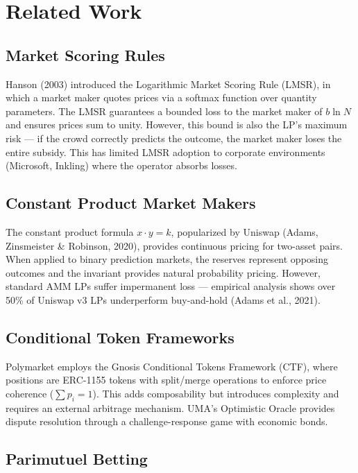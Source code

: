 \documentclass{ledger}
\theoremstyle{plain}
\theoremstyle{remark}
\begin{document}
\section{Related Work}\label{sec:related}

\subsection{Market Scoring Rules}

Hanson (2003) introduced the Logarithmic Market Scoring Rule (LMSR), in which a
market maker quotes prices via a softmax function over quantity parameters. The
LMSR guarantees a bounded loss to the market maker of $b \ln N$ and ensures
prices sum to unity. However, this bound is also the LP's maximum risk --- if
the crowd correctly predicts the outcome, the market maker loses the entire
subsidy. This has limited LMSR adoption to corporate environments (Microsoft,
Inkling) where the operator absorbs losses.

\subsection{Constant Product Market Makers}

The constant product formula $x \cdot y = k$, popularized by Uniswap (Adams,
Zinsmeister \& Robinson, 2020), provides continuous pricing for two-asset pairs.
When applied to binary prediction markets, the reserves represent opposing
outcomes and the invariant provides natural probability pricing. However,
standard AMM LPs suffer impermanent loss --- empirical analysis shows over 50\%
of Uniswap v3 LPs underperform buy-and-hold (Adams et al., 2021).

\subsection{Conditional Token Frameworks}

Polymarket employs the Gnosis Conditional Tokens Framework (CTF), where
positions are ERC-1155 tokens with split/merge operations to enforce price
coherence ($\sum p_i = 1$). This adds composability but introduces complexity
and requires an external arbitrage mechanism. UMA's Optimistic Oracle provides
dispute resolution through a challenge-response game with economic bonds.

\subsection{Parimutuel Betting}
\end{document}
